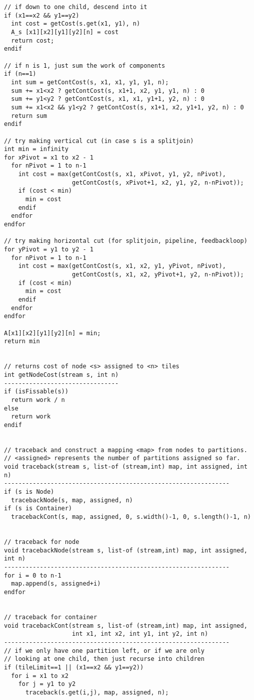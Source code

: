 \begin{verbatim}
// if down to one child, descend into it
if (x1==x2 && y1==y2)
  int cost = getCost(s.get(x1, y1), n)
  A_s [x1][x2][y1][y2][n] = cost
  return cost;
endif

// if n is 1, just sum the work of components
if (n==1)
  int sum = getContCost(s, x1, x1, y1, y1, n);
  sum += x1<x2 ? getContCost(s, x1+1, x2, y1, y1, n) : 0
  sum += y1<y2 ? getContCost(s, x1, x1, y1+1, y2, n) : 0
  sum += x1<x2 && y1<y2 ? getContCost(s, x1+1, x2, y1+1, y2, n) : 0
  return sum
endif

// try making vertical cut (in case s is a splitjoin)
int min = infinity
for xPivot = x1 to x2 - 1
  for nPivot = 1 to n-1
    int cost = max(getContCost(s, x1, xPivot, y1, y2, nPivot),
                   getContCost(s, xPivot+1, x2, y1, y2, n-nPivot));
    if (cost < min)
      min = cost
    endif
  endfor
endfor

// try making horizontal cut (for splitjoin, pipeline, feedbackloop)
for yPivot = y1 to y2 - 1
  for nPivot = 1 to n-1
    int cost = max(getContCost(s, x1, x2, y1, yPivot, nPivot),
                   getContCost(s, x1, x2, yPivot+1, y2, n-nPivot));
    if (cost < min)
      min = cost
    endif
  endfor
endfor

A[x1][x2][y1][y2][n] = min;
return min


// returns cost of node <s> assigned to <n> tiles
int getNodeCost(stream s, int n)
--------------------------------
if (isFissable(s))
  return work / n
else
  return work
endif


// traceback and construct a mapping <map> from nodes to partitions.
// <assigned> represents the number of partitions assigned so far.
void traceback(stream s, list-of (stream,int) map, int assigned, int n)
---------------------------------------------------------------
if (s is Node)
  tracebackNode(s, map, assigned, n)
if (s is Container)
  tracebackCont(s, map, assigned, 0, s.width()-1, 0, s.length()-1, n)


// traceback for node
void tracebackNode(stream s, list-of (stream,int) map, int assigned, int n)
---------------------------------------------------------------
for i = 0 to n-1
  map.append(s, assigned+i)
endfor


// traceback for container
void tracebackCont(stream s, list-of (stream,int) map, int assigned, 
                   int x1, int x2, int y1, int y2, int n)
---------------------------------------------------------------
// if we only have one partition left, or if we are only
// looking at one child, then just recurse into children
if (tileLimit==1 || (x1==x2 && y1==y2))
  for i = x1 to x2
    for j = y1 to y2
      traceback(s.get(i,j), map, assigned, n);


\end{verbatim}
